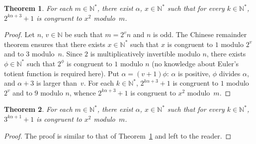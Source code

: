 \documentclass[12pt]{article}
\newcommand{\bN}{\mathbb{N}} %
\newcommand{\bNast}{\bN^*}
\newtheorem{theorem}{Theorem}
\theoremstyle{definition}
\begin{document}
   \begin{theorem} \label{thm:pow-2-square-mod}
     For each $m \in \bNast$,
     there exist $\alpha$, $x \in \bNast$ such that for every  $k \in \bNast$, 
     $2^{k \alpha + 3} + 1$ is congruent to $x^2$  modulo~$m$.
   \end{theorem}

   \begin{proof}
     Let $n$, $v \in \bN$ be such that $m = 2^v n$ and $n$ is odd.
     The Chinese remainder theorem ensures that there exists $x \in \bNast$ such that
     $x$ is congruent to $1$ modulo $2^v$ and to $3$ modulo~$n$.
     Since $2$ is multiplicatively invertible modulo $n$,
     there exists $\phi \in \bNast$ such that $2^\phi$ is congruent to $1$ modulo $n$
     (no knowledge about Euler's totient function is required here).
     Put $\alpha = (v + 1) \phi$:
     $\alpha$ is positive,
     $\phi$ divides $\alpha$, and
     $\alpha + 3$ is larger than~$v$.
     For each $k \in \bNast$,
     $2^{k \alpha + 3} + 1$ is congruent
     to $1$ modulo $2^v$ and
     to $9$ modulo $n$,
     whence $2^{k \alpha + 3} + 1$ is congruent to $x^2$ modulo~$m$.
   \end{proof}
     
   \begin{theorem}
     For each $m \in \bNast$,
     there exist $\alpha$, $x \in \bNast$ such that for every $k \in \bNast$, 
     $3^{k \alpha + 1} + 1$ is congruent to $x^2$ modulo~$m$.
   \end{theorem}

   \begin{proof}
     The proof is similar to that of Theorem~\ref{thm:pow-2-square-mod} and left to the reader.
    \end{proof} 
\end{document}
